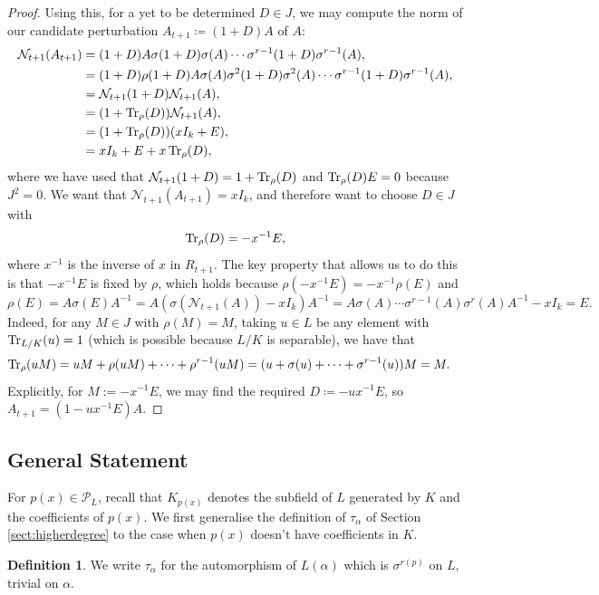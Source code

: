 \documentclass[10pt, reqno, hidelinks]{amsart}
\newcommand{\sN}{{\mathcal N}}
\newcommand{\sP}{{\mathcal P}}
\numberwithin{thm}{subsection}
\theoremstyle{definition}
\newtheorem{defn}[thm]{Definition}
\begin{document}
\begin{proof}
	Using this, for a yet to be determined $D \in J$, we may compute the norm of our candidate perturbation $A_{t+1} \coloneqq (1+D)A$ of $A$:
	\begin{align*}
		\sN_{t+1}(A_{t+1}) &= (1+D)A \sigma(1+D) \sigma(A) \cdots \sigma^{r-1}(1+D) \sigma^{r-1}(A), \\
			&= (1+D)\rho(1+D) A\sigma(A)\sigma^2(1+D) \sigma^2(A) \cdots \sigma^{r-1}(1+D) \sigma^{r-1}(A), \\
			&= \sN_{t+1}(1+D) \sN_{t+1}(A), \\
			&= (1 + \Tr_{\rho}(D)) \sN_{t+1}(A), \\
			&= (1 + \Tr_{\rho}(D)) (x I_k + E), \\
			&= x I_k + E + x \Tr_{\rho}(D),
	\end{align*}
	where we have used that $\sN_{t+1}(1+D) = 1 + \Tr_{\rho}(D)$ and $\Tr_{\rho}(D)E = 0$ because $J^2 = 0$. We want that $\sN_{t+1}(A_{t+1}) = x I_k$, and therefore want to choose $D \in J$ with 
	\[
		\Tr_{\rho}(D) = - x^{-1} E,
	\]
	where $x^{-1}$ is the inverse of $x$ in $R_{t+1}$. The key property that allows us to do this is that $-x^{-1} E$ is fixed by $\rho$, which holds because $\rho(-x^{-1} E) = -x^{-1} \rho(E)$ and
	\[
		\rho(E) = A \sigma(E) A^{-1} = A(\sigma(\sN_{t+1}(A)) - x I_k)A^{-1} = A \sigma(A) \cdots \sigma^{r-1}(A) \sigma^r(A) A^{-1} - x I_k = E.
	\]
		Indeed, for any $M \in J$ with $\rho(M) = M$, taking $u \in L$ be any element with $\Tr_{L/K}(u) = 1$ (which is possible because $L / K$ is separable), we have that
	\begin{align*}
		\Tr_{\rho}(u M) &= u M + \rho(u M) + \cdots + \rho^{r-1}(uM) = (u + \sigma(u) + \cdots + \sigma^{r-1}(u))M = M.
	\end{align*}
	Explicitly, for $M := - x^{-1}E$, we may find the required $D \coloneqq -u x^{-1} E$, so $A_{t+1} = (1 - ux^{-1} E)A$.
\end{proof}

\subsection{General Statement}

For $p(x) \in \sP_L$, recall that $K_{p(x)}$ denotes the subfield of $L$ generated by $K$ and the coefficients of $p(x)$. We first generalise the definition of $\tau_{\alpha}$ of Section \ref{sect:higherdegree} to the case when $p(x)$ doesn't have coefficients in $K$. 

\begin{defn}
	We write $\tau_{\alpha}$ for the automorphism of $L(\alpha)$ which is $\sigma^{r(p)}$ on $L$, trivial on $\alpha$.
\end{defn}
\end{document}
